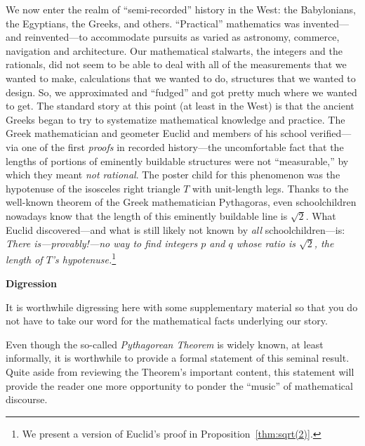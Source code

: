 \noindent {}
\medskip

\noindent
We now enter the realm of ``semi-recorded'' history in the West: the
Babylonians, the Egyptians, the Greeks, and others.  ``Practical''
mathematics was invented---and reinvented---to accommodate pursuits as
varied as astronomy, commerce, navigation and architecture. Our mathematical stalwarts, the
integers and the rationals, did not seem to be able to deal with all
of the measurements that we wanted to make, calculations that we
wanted to do, structures that we wanted to design.  So, we
approximated and ``fudged'' and got pretty much where we wanted to
get.  The standard story at this point (at least in the West) is that
the ancient Greeks began to try to systematize mathematical knowledge
and practice.  The Greek mathematician and geometer Euclid
 and members of his school verified---via one of the
first {\em proofs} in recorded history---the uncomfortable fact that
the lengths of portions of eminently buildable structures were not
``measurable,'' by which they meant {\em not rational}.  The poster
child for this phenomenon was the hypotenuse of the isosceles right
triangle $T$ with unit-length legs.  Thanks to the well-known theorem
of the Greek mathematician Pythagoras,  even
schoolchildren nowadays know that the length of this eminently
buildable line is $\sqrt{2}$.  What Euclid discovered---and what is
still likely not known by {\em all} schoolchildren---is: {\em There
  is---provably!---no way to find integers $p$ and $q$ whose ratio is
  $\sqrt{2}$, the length of $T$'s hypotenuse.}\footnote{We present a
  version of Euclid's proof in Proposition~\ref{thm:sqrt(2)}.}
\bigskip

\noindent \textbf{Digression}

It is worthwhile digressing here with some supplementary material so
that you do not have to take our word for the mathematical facts
underlying our story.

Even though the so-called {\it Pythagorean Theorem} is widely known,
at least informally, it is worthwhile to provide a formal statement of
this seminal result.  Quite aside from reviewing the Theorem's
important content, this statement will provide the reader one more
opportunity to ponder the ``music'' of mathematical discourse.

